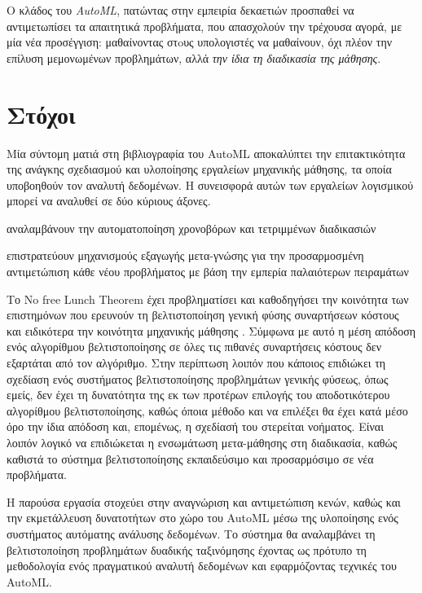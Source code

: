 Ο κλάδος του \textit{AutoML}, πατώντας στην εμπειρία δεκαετιών προσπαθεί να αντιμετωπίσει τα απαιτητικά προβλήματα, που απασχολούν την τρέχουσα αγορά, με μία νέα προσέγγιση: μαθαίνοντας στoυς υπολογιστές να μαθαίνουν, όχι πλέον την επίλυση μεμονωμένων προβλημάτων, αλλά \textit{την ίδια τη διαδικασία της μάθησης}. 
 

\section{Στόχοι} Μία σύντομη ματιά στη βιβλιογραφία του AutoML αποκαλύπτει την επιτακτικότητα της ανάγκης σχεδιασμού και υλοποίησης εργαλείων μηχανικής μάθησης, τα οποία υποβοηθούν τον αναλυτή δεδομένων. Η συνεισφορά αυτών των εργαλείων λογισμικού μπορεί να αναλυθεί σε δύο κύριους άξονες. \begin{enumerate*}[series = tobecont, itemjoin = \qquad]
	\item αναλαμβάνουν την αυτοματοποίηση χρονοβόρων και τετριμμένων διαδικασιών \item επιστρατεύουν μηχανισμούς εξαγωγής μετα-γνώσης για την προσαρμοσμένη αντιμετώπιση κάθε νέου προβλήματος με βάση την εμπερία παλαιότερων πειραμάτων
\end{enumerate*}

Το No free Lunch Theorem  έχει προβληματίσει και καθοδηγήσει την κοινότητα των επιστημόνων που ερευνούν τη βελτιστοποίηση γενική φύσης συναρτήσεων κόστους \citep{Wolpert:1997:NFL:2221336.2221408} και ειδικότερα την κοινότητα μηχανικής μάθησης \citep{Wolpert:1996:LPD:1362127.1362128}. Σύμφωνα με αυτό η μέση απόδοση ενός αλγορίθμου βελτιστοποίησης σε όλες τις πιθανές συναρτήσεις κόστους δεν εξαρτάται από τον αλγόριθμο. Στην περίπτωση λοιπόν που κάποιος επιδιώκει τη σχεδίαση ενός συστήματος βελτιστοποίησης προβλημάτων γενικής φύσεως, όπως εμείς, δεν έχει τη δυνατότητα της εκ των προτέρων επιλογής του αποδοτικότερου αλγορίθμου βελτιστοποίησης, καθώς όποια μέθοδο και να επιλέξει θα έχει κατά μέσο όρο την ίδια απόδοση και, επομένως, η σχεδίασή του στερείται νοήματος. Είναι λοιπόν λογικό να επιδιώκεται η ενσωμάτωση μετα-μάθησης στη διαδικασία, καθώς καθιστά το σύστημα βελτιστοποίησης εκπαιδεύσιμο και προσαρμόσιμο σε νέα προβλήματα.   

Η παρούσα εργασία στοχεύει στην αναγνώριση και αντιμετώπιση κενών, καθώς και την εκμετάλλευση δυνατοτήτων στο χώρο του AutoML μέσω της υλοποίησης ενός συστήματος αυτόματης ανάλυσης δεδομένων. Το σύστημα θα αναλαμβάνει τη βελτιστοποίηση προβλημάτων δυαδικής ταξινόμησης έχοντας ως πρότυπο τη μεθοδολογία ενός πραγματικού αναλυτή δεδομένων και εφαρμόζοντας τεχνικές του \gls{AutoML}.

